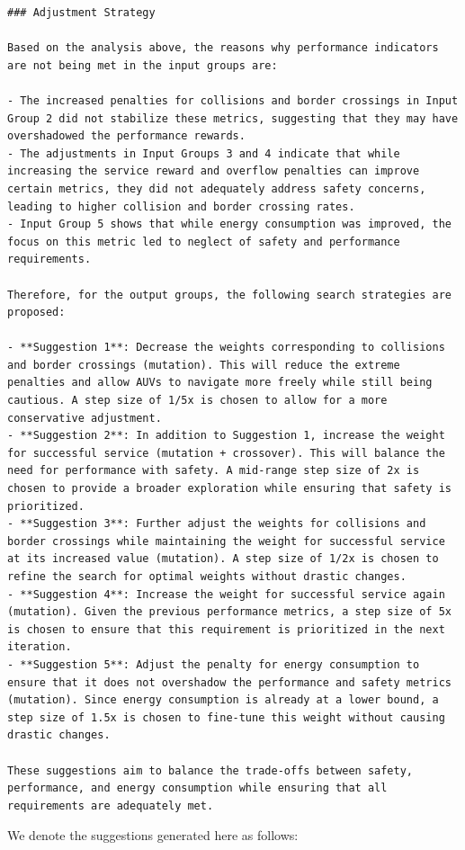 \documentclass{article}
\begin{document}
\begin{verbatim}
### Adjustment Strategy

Based on the analysis above, the reasons why performance indicators are not being met in the input groups are:

- The increased penalties for collisions and border crossings in Input Group 2 did not stabilize these metrics, suggesting that they may have overshadowed the performance rewards.
- The adjustments in Input Groups 3 and 4 indicate that while increasing the service reward and overflow penalties can improve certain metrics, they did not adequately address safety concerns, leading to higher collision and border crossing rates.
- Input Group 5 shows that while energy consumption was improved, the focus on this metric led to neglect of safety and performance requirements.

Therefore, for the output groups, the following search strategies are proposed:

- **Suggestion 1**: Decrease the weights corresponding to collisions and border crossings (mutation). This will reduce the extreme penalties and allow AUVs to navigate more freely while still being cautious. A step size of 1/5x is chosen to allow for a more conservative adjustment.
- **Suggestion 2**: In addition to Suggestion 1, increase the weight for successful service (mutation + crossover). This will balance the need for performance with safety. A mid-range step size of 2x is chosen to provide a broader exploration while ensuring that safety is prioritized.
- **Suggestion 3**: Further adjust the weights for collisions and border crossings while maintaining the weight for successful service at its increased value (mutation). A step size of 1/2x is chosen to refine the search for optimal weights without drastic changes.
- **Suggestion 4**: Increase the weight for successful service again (mutation). Given the previous performance metrics, a step size of 5x is chosen to ensure that this requirement is prioritized in the next iteration.
- **Suggestion 5**: Adjust the penalty for energy consumption to ensure that it does not overshadow the performance and safety metrics (mutation). Since energy consumption is already at a lower bound, a step size of 1.5x is chosen to fine-tune this weight without causing drastic changes.

These suggestions aim to balance the trade-offs between safety, performance, and energy consumption while ensuring that all requirements are adequately met.
\end{verbatim}

We denote the suggestions generated here as follows:
\end{document}
